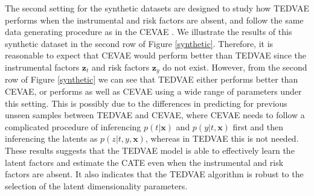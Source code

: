 \documentclass[letterpaper]{article} %
\begin{document}
The second setting for the synthetic datasets are designed to study how TEDVAE performs when the instrumental and risk factors are absent, and follow the same data generating procedure as in the CEVAE \cite{Louizos2017}.
We illustrate the results of this synthetic dataset in the second row of Figure \ref{synthetic}. Therefore, it is reasonable to expect that CEVAE would perform better than TEDVAE since the instrumental factors $\mathbf{z}_t$ and risk factors $\mathbf{z}_y$ do not exist.
However, from the second row of Figure \ref{synthetic} we can see that TEDVAE either performs better than  CEVAE, or performs as well as CEVAE using a wide range of parameters under this setting.
This is possibly due to the differences in predicting for previous unseen samples between TEDVAE and CEVAE, where CEVAE needs to follow a complicated procedure of inferencing $p(t|\mathbf{x})$ and $p(y|t,\mathbf{x})$ first and then inferencing the latents as $p(z|t,y,\mathbf{x})$, whereas in TEDVAE this is not needed.
These results suggests that the TEDVAE model is able to effectively learn the latent factors and estimate the CATE even when the instrumental and risk factors are absent. It also indicates that the TEDVAE algorithm is robust to the selection of the latent dimensionality parameters.
\end{document}
